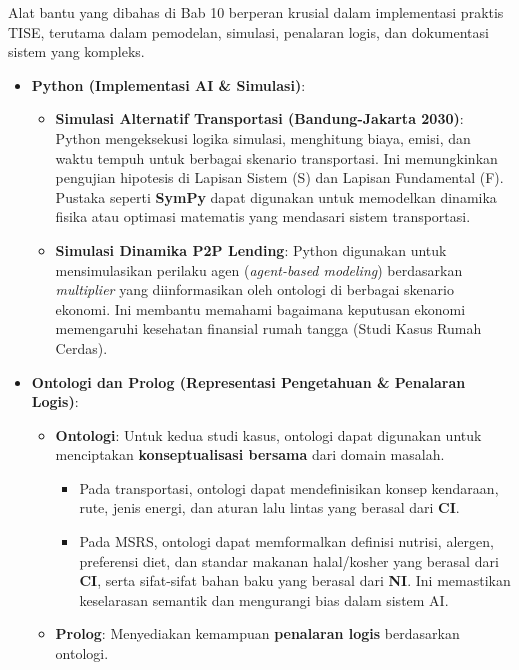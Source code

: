 \documentclass[
  letterpaper,
  DIV=11,
  numbers=noendperiod]{scrreprt}
\providecommand{\tightlist}{%
  \setlength{\itemsep}{0pt}\setlength{\parskip}{0pt}}
\begin{document}
Alat bantu yang dibahas di Bab 10 berperan krusial dalam implementasi
praktis TISE, terutama dalam pemodelan, simulasi, penalaran logis, dan
dokumentasi sistem yang kompleks.

\begin{itemize}
\tightlist
\item
  \textbf{Python (Implementasi AI \& Simulasi)}:

  \begin{itemize}
  \tightlist
  \item
    \textbf{Simulasi Alternatif Transportasi (Bandung-Jakarta 2030)}:
    Python mengeksekusi logika simulasi, menghitung biaya, emisi, dan
    waktu tempuh untuk berbagai skenario transportasi. Ini memungkinkan
    pengujian hipotesis di Lapisan Sistem (S) dan Lapisan Fundamental
    (F). Pustaka seperti \textbf{SymPy} dapat digunakan untuk memodelkan
    dinamika fisika atau optimasi matematis yang mendasari sistem
    transportasi.
  \item
    \textbf{Simulasi Dinamika P2P Lending}: Python digunakan untuk
    mensimulasikan perilaku agen (\emph{agent-based modeling})
    berdasarkan \emph{multiplier} yang diinformasikan oleh ontologi di
    berbagai skenario ekonomi. Ini membantu memahami bagaimana keputusan
    ekonomi memengaruhi kesehatan finansial rumah tangga (Studi Kasus
    Rumah Cerdas).
  \end{itemize}
\item
  \textbf{Ontologi dan Prolog (Representasi Pengetahuan \& Penalaran
  Logis)}:

  \begin{itemize}
  \tightlist
  \item
    \textbf{Ontologi}: Untuk kedua studi kasus, ontologi dapat digunakan
    untuk menciptakan \textbf{konseptualisasi bersama} dari domain
    masalah.

    \begin{itemize}
    \tightlist
    \item
      Pada transportasi, ontologi dapat mendefinisikan konsep kendaraan,
      rute, jenis energi, dan aturan lalu lintas yang berasal dari
      \textbf{CI}.
    \item
      Pada MSRS, ontologi dapat memformalkan definisi nutrisi, alergen,
      preferensi diet, dan standar makanan halal/kosher yang berasal
      dari \textbf{CI}, serta sifat-sifat bahan baku yang berasal dari
      \textbf{NI}. Ini memastikan keselarasan semantik dan mengurangi
      bias dalam sistem AI.
    \end{itemize}
  \item
    \textbf{Prolog}: Menyediakan kemampuan \textbf{penalaran logis}
    berdasarkan ontologi.


\end{itemize}
\end{itemize}
\end{document}
